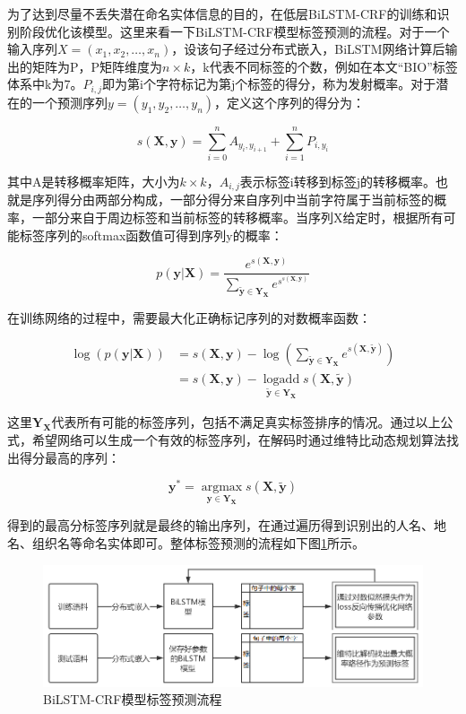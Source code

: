 \documentclass[winfonts,master,oneside,nobackinfo]{njuthesis}
\begin{document}
为了达到尽量不丢失潜在命名实体信息的目的，在低层BiLSTM-CRF的训练和识别阶段优化该模型。这里来看一下BiLSTM-CRF模型标签预测的流程。对于一个输入序列$X=\left(x_{1}, x_{2}, \ldots, x_{n}\right)$，设该句子经过分布式嵌入，BiLSTM网络计算后输出的矩阵为P，P矩阵维度为$n \times k$，k代表不同标签的个数，例如在本文“BIO”标签体系中k为7。$P_{i, j}$即为第i个字符标记为第j个标签的得分，称为发射概率。对于潜在的一个预测序列$y=\left(y_{1}, y_{2}, \ldots, y_{n}\right)$，定义这个序列的得分为：

\begin{equation} 
s(\bm{X}, \bm{y})=\sum_{i=0}^{n} A_{y_{i}, y_{i+1}}+\sum_{i=1}^{n} P_{i, y_{i}}
\label{4-1}
\end{equation}

其中A是转移概率矩阵，大小为$k \times k$，$A_{i, j}$表示标签i转移到标签j的转移概率。也就是序列得分由两部分构成，一部分得分来自序列中当前字符属于当前标签的概率，一部分来自于周边标签和当前标签的转移概率。当序列X给定时，根据所有可能标签序列的softmax函数值可得到序列y的概率：

\begin{equation} 
p(\bm{y} | \bm{X})=\frac{e^{s(\bm{X}, \bm{y})}}{\sum_{\tilde{\bm{y}} \in \bm{Y}_{\bm{X}}} e^{s^{s(\bm{X}, \overline{\bm{y}})}}}
\end{equation}

在训练网络的过程中，需要最大化正确标记序列的对数概率函数：

\begin{equation} 
\begin{aligned} \log (p(\bm{y} | \bm{X})) &=s(\bm{X}, \bm{y})-\log \left(\sum_{\tilde{\bm{y}} \in \bm{Y}_{\bm{X}}} e^{s(\bm{X}, \widetilde{\bm{y}})}\right) \\ &=s(\bm{X}, \bm{y})-\operatorname*{logadd}\limits_{\widetilde{\bm{y}} \in \bm{Y}_{\bm{X}}} s(\bm{X}, \widetilde{\bm{y}}) \end{aligned}
\end{equation}

这里$\bm{Y}_{\bm{X}}$代表所有可能的标签序列，包括不满足真实标签排序的情况。通过以上公式，希望网络可以生成一个有效的标签序列，在解码时通过维特比动态规划算法找出得分最高的序列：

\begin{equation} 
\bm{y}^{*}=\underset{\bm{y} \in \bm{Y}_{\bm{X}}}{\operatorname{argmax}} s(\bm{X}, \widetilde{\bm{y}})
\end{equation}

得到的最高分标签序列就是最终的输出序列，在通过遍历得到识别出的人名、地名、组织名等命名实体即可。整体标签预测的流程如下图\ref{predict}所示。
\begin{figure}[H]
\centering
\includegraphics[width=1\textwidth]{./figure/标签预测流程.jpg}
\caption{BiLSTM-CRF模型标签预测流程}
\label{predict}
\end{figure}
\end{document}
